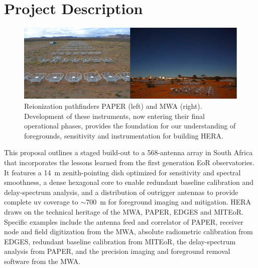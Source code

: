 \documentclass[preprint]{aastex}
\begin{document}
\section{Project Description}
\label{PDsec}
\begin{figure}[!ht]\centering
\includegraphics[width=6.5in]{plots/PAPER_and_MWA.jpg}
\caption{\small
Reionization pathfinders PAPER (left) and MWA (right). Development of these instruments, now entering their final operational phases, provides the foundation for our understanding of foregrounds, sensitivity and instrumentation for building HERA.
}
\end{figure}

This proposal outlines a staged build-out to a 568-antenna array in South Africa that incorporates the lessons learned from the first generation EoR observatories. It features a 14~m zenith-pointing dish optimized for sensitivity and spectral smoothness, a dense hexagonal core to enable redundant baseline calibration and delay-spectrum analysis, and a distribution of outrigger antennas to provide complete uv coverage to $\sim$700~m for foreground imaging and mitigation. HERA draws on the technical heritage of the MWA, PAPER, EDGES and MITEoR. Specific examples include the antenna feed and correlator of PAPER, receiver node and field digitization from the MWA, absolute radiometric calibration from EDGES, redundant baseline calibration from MITEoR, the delay-spectrum analysis from PAPER, and the precision imaging and foreground removal software from the MWA.
\end{document}

